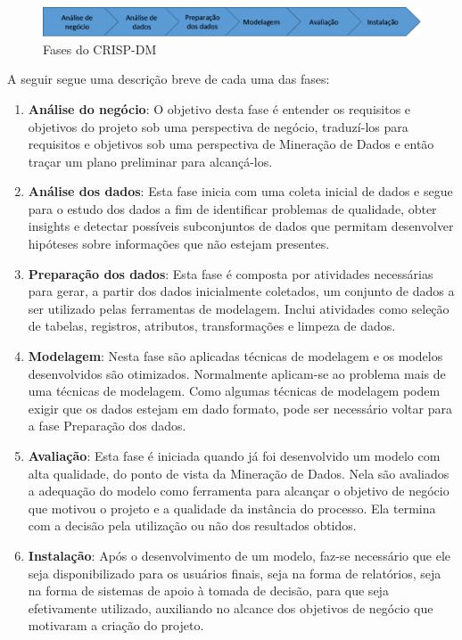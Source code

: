 
\begin{figure}[H]
	\includegraphics[scale=0.8]{img/CRISP-DM-main.png}
	\caption{Fases do CRISP-DM}
	\label{img:CRISP-DM-diagram}
\end{figure}

A seguir segue uma descrição breve de cada uma das fases:

\begin{enumerate}

\item \textbf{Análise do negócio}:
O objetivo desta fase é entender os requisitos e objetivos do projeto sob uma perspectiva de negócio, traduzí-los para requisitos e objetivos sob uma perspectiva de Mineração de Dados e então traçar um plano preliminar para alcançá-los.

\item \textbf{Análise dos dados}:
Esta fase inicia com uma coleta inicial de dados e segue para o estudo dos dados a fim de identificar problemas de qualidade, obter insights e detectar possíveis subconjuntos de dados que permitam desenvolver hipóteses sobre informações que não estejam presentes.

\item \textbf{Preparação dos dados}:
Esta fase é composta por atividades necessárias para gerar, a partir dos dados inicialmente coletados, um conjunto de dados a ser utilizado pelas ferramentas de modelagem. Inclui atividades como seleção de tabelas, registros, atributos, transformações e limpeza de dados.

\item \textbf{Modelagem}:
Nesta fase são aplicadas técnicas de modelagem e os modelos desenvolvidos são otimizados. Normalmente aplicam-se ao problema mais de uma técnicas de modelagem. Como algumas técnicas de modelagem podem exigir que os dados estejam em dado formato, pode ser necessário voltar para a fase Preparação dos dados.

\item \textbf{Avaliação}:
Esta fase é iniciada quando já foi desenvolvido um modelo com alta qualidade, do ponto de vista da Mineração de Dados. Nela são avaliados a adequação do modelo como ferramenta para alcançar o objetivo de negócio que motivou o projeto e a qualidade da instância do processo. Ela termina com a decisão pela utilização ou não dos resultados obtidos.

\item \textbf{Instalação}:
Após o desenvolvimento de um modelo, faz-se necessário que ele seja disponibilizado para os usuários finais, seja na forma de relatórios, seja na forma de sistemas de apoio à tomada de decisão, para que seja efetivamente utilizado, auxiliando no alcance dos objetivos de negócio que motivaram a criação do projeto.

\end{enumerate}

